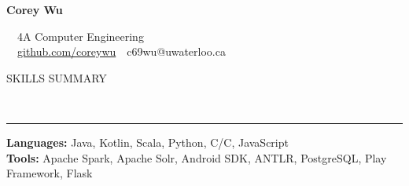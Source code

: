 \documentclass[11pt, letterpaper, oneside]{article}
\makeatletter
\newcommand{\name}{Corey Wu}
\newcommand{\program}{4A Computer Engineering}
\newcommand{\github}{\href{https://github.com/coreywu}{github.com/coreywu}}
\newcommand{\email}{c69wu@uwaterloo.ca}
\newcommand{\HRule}[2]{\textcolor{#1}{\rule{\linewidth}{#2}}}
\newcommand{\sectiontitle}[1]{\begin{minipage}{\textwidth}\vspace{-7.5pt}\begin{flushleft}\hspace{-20.5pt}\vspace{-25pt}
\Large\MakeUppercase{#1}\end{flushleft}\end{minipage}\\\HRule{black}{0.15mm}\vspace{\baselineskip}}
\newenvironment{ressection}[1]{
  \sectiontitle{#1}}
  {\vspace{-\baselineskip}}
\newcommand{\CPP}
{C\nolinebreak[4]\hspace{-.05em}\raisebox{.22ex}{\footnotesize\bf ++}}
\makeatother
\begin{document}
\begin{center}

	{\Huge \textbf{\name}}

	\ \ {\Large{\program}} \\
	\ \ \github \ \textbullet \ \email \ \
\end{center}

\vspace{-6pt}

\begin{ressection}{Skills Summary}\vspace{-12pt}
  \hspace{-20pt} \textbf{Languages:} Java, Kotlin, Scala, Python, C/\CPP, JavaScript \\
  \hspace{-20pt} \textbf{Tools:} Apache Spark, Apache Solr, Android SDK, ANTLR,  PostgreSQL, Play Framework, Flask
\end{ressection}

\vspace{20pt}
\end{document}
